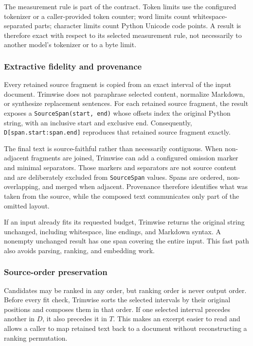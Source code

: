 \documentclass[
]{article}
\newcounter{none} %
\begin{document}
The measurement rule is part of the contract. Token limits use the
configured tokenizer or a caller-provided token counter; word limits
count whitespace-separated parts; character limits count Python Unicode
code points. A result is therefore exact with respect to its selected
measurement rule, not necessarily to another model's tokenizer or to a
byte limit.

\subsubsection{Extractive fidelity and
provenance}\label{extractive-fidelity-and-provenance}

Every retained source fragment is copied from an exact interval of the
input document. Trimwise does not paraphrase selected content, normalize
Markdown, or synthesize replacement sentences. For each retained source
fragment, the result exposes a \texttt{SourceSpan(start,\ end)} whose
offsets index the original Python string, with an inclusive start and
exclusive end. Consequently, \texttt{D{[}span.start:span.end{]}}
reproduces that retained source fragment exactly.

The final text is source-faithful rather than necessarily contiguous.
When non-adjacent fragments are joined, Trimwise can add a configured
omission marker and minimal separators. Those markers and separators are
not source content and are deliberately excluded from
\texttt{SourceSpan} values. Spans are ordered, non-overlapping, and
merged when adjacent. Provenance therefore identifies what was taken
from the source, while the composed text communicates only part of the
omitted layout.

If an input already fits its requested budget, Trimwise returns the
original string unchanged, including whitespace, line endings, and
Markdown syntax. A nonempty unchanged result has one span covering the
entire input. This fast path also avoids parsing, ranking, and embedding
work.

\subsubsection{Source-order
preservation}\label{source-order-preservation}

Candidates may be ranked in any order, but ranking order is never output
order. Before every fit check, Trimwise sorts the selected intervals by
their original positions and composes them in that order. If one
selected interval precedes another in \(D\), it also precedes it in
\(T\). This makes an excerpt easier to read and allows a caller to map
retained text back to a document without reconstructing a ranking
permutation.
\end{document}
